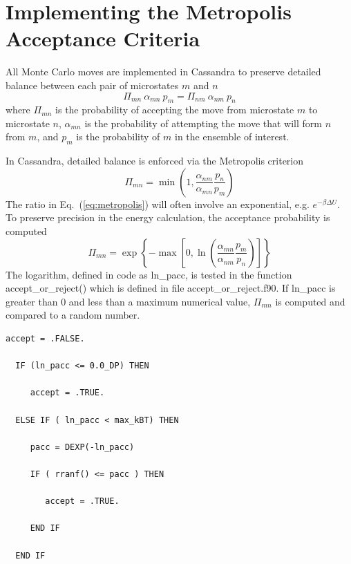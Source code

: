 \chapter{Implementing the Metropolis Acceptance Criteria}

All Monte Carlo moves are implemented in Cassandra to preserve detailed balance between each pair of microstates $m$ and $n$
\begin{equation}
\label{eq:detailedBalance}
\Pi_{mn}\ \alpha_{mn}\ p_m = \Pi_{nm}\ \alpha_{nm}\ p_n
\end{equation}
where $\Pi_{mn}$ is the probability of accepting the move from microstate $m$ to microstate $n$, $\alpha_{mn}$ is the probability of attempting the move that will form $n$ from $m$, and $p_m$ is the probability of $m$ in the ensemble of interest.

In Cassandra, detailed balance is enforced via the Metropolis criterion
\begin{equation}
\label{eq:metropolis}
\Pi_{mn} = \min\left(1, \frac{\alpha_{nm}}{\alpha_{mn}} \frac{p_n}{p_m} \right)
\end{equation}
The ratio in Eq.\ (\ref{eq:metropolis}) will often involve an exponential, e.g. $e^{-\beta \Delta U}$. To preserve precision in the energy calculation, the acceptance probability is computed
\begin{equation}
\label{eq:metropolis_2}
\Pi_{mn} = \exp\left\{-\max\left[0, \ln\left(\frac{\alpha_{mn}}{\alpha_{nm}} \frac{p_m}{p_n}\right)\right]\right\}
\end{equation}
The logarithm, defined in code as ln\_pacc, is tested in the function accept\_or\_reject() which is defined in file accept\_or\_reject.f90. If ln\_pacc is greater than 0 and less than a maximum numerical value, $\Pi_{mn}$ is computed and compared to a random number.

\begin{minipage}{\linewidth}
\begin{lstlisting}[firstnumber=47, caption=accept\_or\_reject.f90]
  accept = .FALSE.

  IF (ln_pacc <= 0.0_DP) THEN

     accept = .TRUE.

  ELSE IF ( ln_pacc < max_kBT) THEN

     pacc = DEXP(-ln_pacc)

     IF ( rranf() <= pacc ) THEN
         
        accept = .TRUE.

     END IF

  END IF
\end{lstlisting}
\end{minipage}

